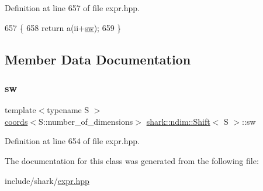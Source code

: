 Definition at line 657 of file expr.\+hpp.


\begin{DoxyCode}
657                                                                                                            
               \{
658                 \textcolor{keywordflow}{return} a(ii+\hyperlink{classshark_1_1ndim_1_1_shift_a3bd6f579c282ca70d391bd43bc582331}{sw});
659             \}
\end{DoxyCode}


\subsection{Member Data Documentation}
\hypertarget{classshark_1_1ndim_1_1_shift_a3bd6f579c282ca70d391bd43bc582331}{}\label{classshark_1_1ndim_1_1_shift_a3bd6f579c282ca70d391bd43bc582331} 
\subsubsection{\texorpdfstring{sw}{sw}}
{\footnotesize\ttfamily template$<$typename S $>$ \\
\hyperlink{structshark_1_1ndim_1_1coords}{coords}$<$S\+::number\+\_\+of\+\_\+dimensions$>$ \hyperlink{classshark_1_1ndim_1_1_shift}{shark\+::ndim\+::\+Shift}$<$ S $>$\+::sw\hspace{0.3cm}{\ttfamily [private]}}



Definition at line 654 of file expr.\+hpp.



The documentation for this class was generated from the following file\+:\begin{DoxyCompactItemize}
\item 
include/shark/\hyperlink{expr_8hpp}{expr.\+hpp}\end{DoxyCompactItemize}
